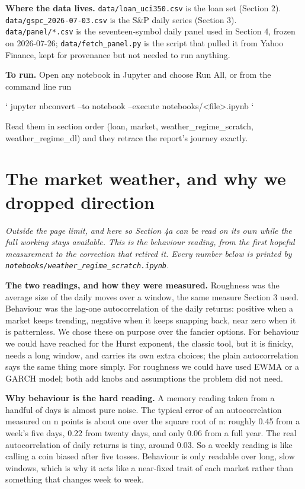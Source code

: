 \documentclass[11pt]{article} %
\begin{document}
\textbf{Where the data lives.} \texttt{data/loan\_uci350.csv} is the loan set (Section 2). \texttt{data/gspc\_2026-07-03.csv} is the S\&P daily series (Section 3). \texttt{data/panel/*.csv} is the seventeen-symbol daily panel used in Section 4, frozen on 2026-07-26; \texttt{data/fetch\_panel.py} is the script that pulled it from Yahoo Finance, kept for provenance but not needed to run anything.

\textbf{To run.} Open any notebook in Jupyter and choose Run All, or from the command line run

\texttt{}`
jupyter nbconvert --to notebook --execute notebooks/<file>.ipynb
\texttt{}`

Read them in section order (loan, market, weather\_regime\_scratch, weather\_regime\_dl) and they retrace the report's journey exactly.



\section{The market weather, and why we dropped direction}


\emph{Outside the page limit, and here so Section 4a can be read on its own while the full working stays available. This is the behaviour reading, from the first hopeful measurement to the correction that retired it. Every number below is printed by \texttt{notebooks/weather\_regime\_scratch.ipynb}.}

\textbf{The two readings, and how they were measured.} Roughness was the average size of the daily moves over a window, the same measure Section 3 used. Behaviour was the lag-one autocorrelation of the daily returns: positive when a market keeps trending, negative when it keeps snapping back, near zero when it is patternless. We chose these on purpose over the fancier options. For behaviour we could have reached for the Hurst exponent, the classic tool, but it is finicky, needs a long window, and carries its own extra choices; the plain autocorrelation says the same thing more simply. For roughness we could have used EWMA or a GARCH model; both add knobs and assumptions the problem did not need.

\textbf{Why behaviour is the hard reading.} A memory reading taken from a handful of days is almost pure noise. The typical error of an autocorrelation measured on n points is about one over the square root of n: roughly 0.45 from a week's five days, 0.22 from twenty days, and only 0.06 from a full year. The real autocorrelation of daily returns is tiny, around 0.03. So a weekly reading is like calling a coin biased after five tosses. Behaviour is only readable over long, slow windows, which is why it acts like a near-fixed trait of each market rather than something that changes week to week.
\end{document}
